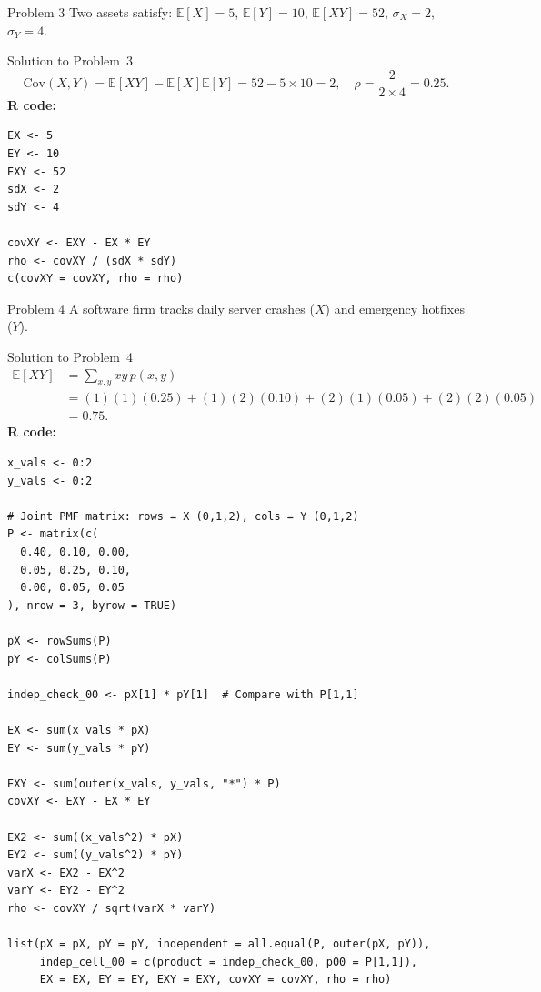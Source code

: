 \documentclass[12pt,a4paper]{article}
\newcommand{\E}{\mathbb{E}}
\newcommand{\Cov}{\mathrm{Cov}}
\begin{document}
\vspace{6pt}

\begin{problembox}{Problem 3}
Two assets satisfy:
$\E[X]=5$, $\E[Y]=10$, $\E[XY]=52$, $\sigma_X=2$, $\sigma_Y=4$.
\end{problembox}

\begin{solutionbox}{Solution to Problem~3}
\[
\Cov(X,Y)=\E[XY]-\E[X]\E[Y]=52-5\times10=2,\quad
\rho=\frac{2}{2\times4}=0.25.
\]
\textbf{R code:}
\begin{lstlisting}[style=rcode]
EX <- 5
EY <- 10
EXY <- 52
sdX <- 2
sdY <- 4

covXY <- EXY - EX * EY
rho <- covXY / (sdX * sdY)
c(covXY = covXY, rho = rho)
\end{lstlisting}
\end{solutionbox}

\vspace{6pt}

\begin{problembox}{Problem 4}
A software firm tracks daily server crashes ($X$) and emergency hotfixes ($Y$).
\end{problembox}

\begin{solutionbox}{Solution to Problem~4}
\[
\begin{aligned}
\E[XY]
&=\sum_{x,y}xy\,p(x,y)\\
&=(1)(1)(0.25)+(1)(2)(0.10)+(2)(1)(0.05)+(2)(2)(0.05)\\
&=0.75.
\end{aligned}
\]
\textbf{R code:}
\begin{lstlisting}[style=rcode]
x_vals <- 0:2
y_vals <- 0:2

# Joint PMF matrix: rows = X (0,1,2), cols = Y (0,1,2)
P <- matrix(c(
  0.40, 0.10, 0.00,
  0.05, 0.25, 0.10,
  0.00, 0.05, 0.05
), nrow = 3, byrow = TRUE)

pX <- rowSums(P)
pY <- colSums(P)

indep_check_00 <- pX[1] * pY[1]  # Compare with P[1,1]

EX <- sum(x_vals * pX)
EY <- sum(y_vals * pY)

EXY <- sum(outer(x_vals, y_vals, "*") * P)
covXY <- EXY - EX * EY

EX2 <- sum((x_vals^2) * pX)
EY2 <- sum((y_vals^2) * pY)
varX <- EX2 - EX^2
varY <- EY2 - EY^2
rho <- covXY / sqrt(varX * varY)

list(pX = pX, pY = pY, independent = all.equal(P, outer(pX, pY)),
     indep_cell_00 = c(product = indep_check_00, p00 = P[1,1]),
     EX = EX, EY = EY, EXY = EXY, covXY = covXY, rho = rho)
\end{lstlisting}
\end{solutionbox}
\end{document}
